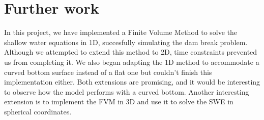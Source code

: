 \chapter{Further work}
In this project, we have implemented a Finite Volume Method to solve the shallow water equations in 1D, succesfully simulating the dam break problem.
Although we attempted to extend this method to 2D, time constraints prevented us from completing it.
We also began adapting the 1D method to accommodate a curved bottom surface instead of a flat one but couldn't finish this implementation either.
Both extensions are promising, and it would be interesting to observe how the model performs with a curved bottom.
Another interesting extension is to implement the FVM in 3D and use it to solve the SWE in spherical coordinates.
